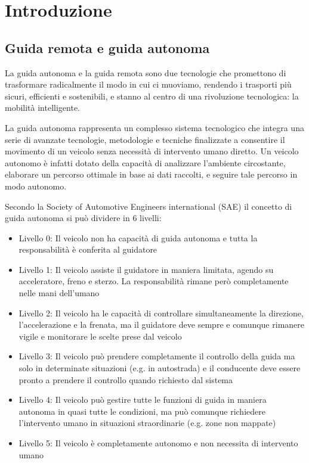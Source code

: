 \chapter{Introduzione} \label{introduzione}
\section{Guida remota e guida autonoma}
La guida autonoma e la guida remota sono due tecnologie che promettono di trasformare radicalmente il modo in cui ci muoviamo, rendendo i trasporti più sicuri, efficienti e sostenibili, e stanno al centro di una rivoluzione tecnologica: la mobilità intelligente.

\noindent La guida autonoma rappresenta un complesso sistema tecnologico che integra una serie di avanzate tecnologie, metodologie e tecniche finalizzate a consentire il movimento di un veicolo senza necessità di intervento umano diretto. Un veicolo autonomo è infatti dotato della capacità di analizzare l'ambiente circostante, elaborare un percorso ottimale in base ai dati raccolti, e seguire tale percorso in modo autonomo. 

\noindent Secondo la Society of Automotive Engineers international (SAE)\cite{SAE_autonomous_vehicle} il concetto di guida autonoma si può dividere in 6 livelli:

\begin{itemize}
  \item Livello 0: Il veicolo non ha capacità di guida autonoma e tutta la responsabilità è conferita al guidatore  
  \item Livello 1: Il veicolo assiste il guidatore in maniera limitata, agendo su acceleratore, freno e sterzo. La responsabilità rimane però completamente nelle mani dell'umano 
  \item Livello 2: Il veicolo ha le capacità di controllare simultaneamente la direzione, l'accelerazione e la frenata, ma il guidatore deve sempre e comunque rimanere vigile e monitorare le scelte prese dal veicolo
  \item Livello 3: Il veicolo può prendere completamente il controllo della guida ma solo in determinate situazioni (e.g. in autostrada) e il conducente deve essere pronto a prendere il controllo quando richiesto dal sistema
  \item Livello 4: Il veicolo può gestire tutte le funzioni di guida in maniera autonoma in quasi tutte le condizioni, ma può comunque richiedere l'intervento umano in situazioni straordinarie (e.g. zone non mappate)
  \item Livello 5: Il veicolo è completamente autonomo e non necessita di intervento umano
\end{itemize}


